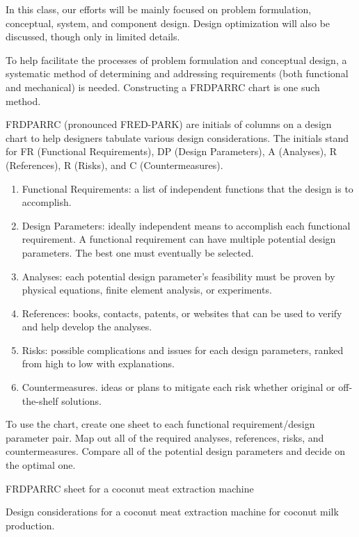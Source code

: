 \documentclass[
10pt,
a4paper,
openany,
svgnames,
]{book}
\begin{document}
In this class, our efforts will be mainly focused on problem formulation, conceptual, system, and component design. Design optimization will also be discussed, though only in limited details.

To help facilitate the processes of problem formulation and conceptual design, a systematic method of determining and addressing requirements (both functional and mechanical) is needed. Constructing a FRDPARRC chart is one such method.

FRDPARRC (pronounced FRED-PARK) are initials of columns on a design chart to help designers tabulate various design considerations. The initials stand for FR (Functional Requirements), DP (Design Parameters), A (Analyses), R (References), R (Risks), and C (Countermeasures).

\begin{enumerate}
\item Functional Requirements: a list of independent functions that the design is to accomplish.
\item Design Parameters: ideally independent means to accomplish each functional requirement. A functional requirement can have multiple potential design parameters. The best one must eventually be selected.
\item Analyses: each potential design parameter’s feasibility must be proven by physical equations, finite element analysis, or experiments.
\item References: books, contacts, patents, or websites that can be used to verify and help develop the analyses.
\item Risks: possible complications and issues for each design parameters, ranked from high to low with explanations.
\item Countermeasures. ideas or plans to mitigate each risk whether original or off-the-shelf solutions.
\end{enumerate}

To use the chart, create one sheet to each functional requirement/design parameter pair. Map out all of the required analyses, references, risks, and countermeasures. Compare all of the potential design parameters and decide on the optimal one.

\begin{example}
  FRDPARRC sheet for a coconut meat extraction machine

  Design considerations for a coconut meat extraction machine for
  coconut milk production.
\end{example}
\end{document}
